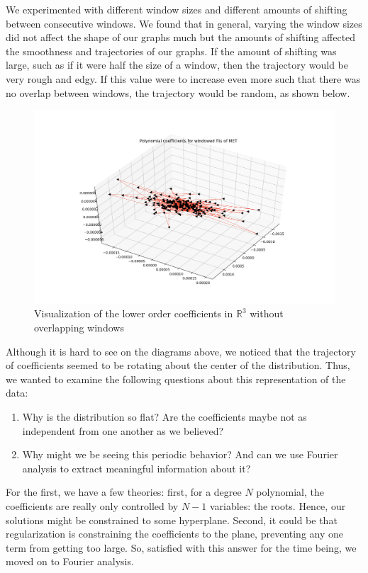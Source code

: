 \documentclass[final]{article}
\begin{document}
We experimented with different window sizes and different amounts of
shifting between consecutive windows. We found that in general,
varying the window sizes did not affect the shape of our graphs much
but the amounts of shifting affected the smoothness and trajectories
of our graphs. If the amount of shifting was large, such as if it were
half the size of a window, then the trajectory would be very rough and
edgy. If this value were to increase even more such that there was no
overlap between windows, the trajectory would be random, as shown
below.

\begin{figure}[H]
  \centering
  \includegraphics[width=\linewidth]{img/coeff3}
  \caption{Visualization of the lower order coefficients in $\mathbb{R}^3$
  without overlapping windows}
  \label{fig:coeff3}
\end{figure}

Although it is hard to see on the diagrams above, we noticed that the
trajectory of coefficients seemed to be rotating about the center of
the distribution. Thus, we wanted to examine the following questions
about this representation of the data:
\begin{enumerate}
  \item Why is the distribution so flat? Are the coefficients maybe
    not as independent from one another as we believed?
  \item Why might we be seeing this periodic behavior? And can we use
    Fourier analysis to extract meaningful information about it?
\end{enumerate}
For the first, we have a few theories: first, for a degree $N$
polynomial, the coefficients are really only controlled by $N-1$
variables: the roots. Hence, our solutions might be constrained to
some hyperplane. Second, it could be that regularization is
constraining the coefficients to the plane, preventing any one term
from getting too large. So, satisfied with this answer for the time
being, we moved on to Fourier analysis.
\end{document}

